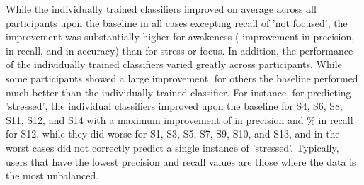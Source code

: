 While the individually trained classifiers
improved on average across all participants upon the baseline in all
cases excepting recall of 'not focused', the improvement was
substantially higher for awakeness ( improvement in precision,
 in recall, and  in accuracy) than for stress or focus. In addition,
the performance of the individually trained classifiers varied greatly
across participants. While some participants showed a large
improvement, for others the baseline performed much better than the
individually trained classifier. For instance, for predicting
'stressed', the individual classifiers improved upon the baseline for
S4, S6, S8, S11, S12, and S14 with a maximum improvement of  in
precision and \% in recall for S12, while they did worse for S1,
S3, S5, S7, S9, S10, and S13, and in the worst cases did not correctly
predict a single instance of 'stressed'. Typically, users that have the
lowest precision and recall values are those where the data is the
most unbalanced.\\[-0.1cm]
%


